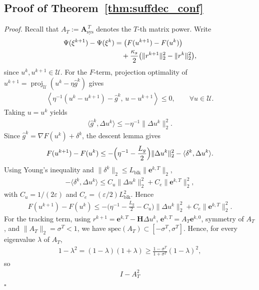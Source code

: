 \documentclass[letterpaper, 10 pt, conference]{ieeeconf} %
\newenvironment{proof}[1][Proof]{\par\noindent\textit{#1. }\ignorespaces}
  {\hfill$\square$\par}
\DeclareMathOperator{\proj}{proj}
\begin{document}
\subsection{Proof of Theorem~\ref{thm:suffdec_conf}}
\begin{proof}
Recall that \(A_T:=\mathbf A_{\mathrm{sys}}^{\,T}\) denotes the \(T\)-th matrix power. Write
\begin{align}
\Psi(\xi^{k+1})-\Psi(\xi^k)
&= \big(F(u^{k+1})-F(u^k)\big) \notag\\
&\quad +\frac{\kappa_s}{2}\big(\|r^{k+1}\|_2^2-\|r^k\|_2^2\big),
\end{align}
since \(u^k,u^{k+1}\in\mathcal U\).
For the \(F\)-term, projection optimality of \(u^{k+1}=\proj_{\mathcal U}(u^k-\eta\hat g^k)\) gives
\begin{align}
\left\langle
\eta^{-1}(u^k-u^{k+1})-\hat g^k,\,
u-u^{k+1}
\right\rangle
\le 0,
\qquad \forall u\in\mathcal U .
\end{align}
Taking \(u=u^k\) yields
\begin{align}
\langle \hat g^k,\Delta u^k\rangle
\le
-\eta^{-1}\|\Delta u^k\|_2^2 .
\end{align}
Since \(\hat g^k=\nabla F(u^k)+\delta^k\), the descent lemma gives
\begin{align}
F(u^{k+1})-F(u^k)
\le
-\Bigl(\eta^{-1}-\frac{L_g}{2}\Bigr)\|\Delta u^k\|_2^2
-\langle \delta^k,\Delta u^k\rangle .
\end{align}
Using Young's inequality and
\(\|\delta^k\|_2\le L_{\mathrm{blk}}\|\mathbf e^{k,T}\|_2\),
\begin{align}
-\langle \delta^k,\Delta u^k\rangle
\le
C_u\|\Delta u^k\|_2^2
+
C_e\|\mathbf e^{k,T}\|_2^2 ,
\end{align}
with \(C_u=1/(2\varepsilon)\) and
\(C_e=(\varepsilon/2)L_{\mathrm{blk}}^2\). Hence
\begin{align}
F(u^{k+1})-F(u^k)
\le
-\Big(\eta^{-1}-\frac{L_g}{2}-C_u\Big)
\|\Delta u^k\|_2^2
+
C_e\|\mathbf e^{k,T}\|_2^2 .
\end{align}
For the tracking term, using \(r^{k+1}=\mathbf e^{k,T}-\mathbf H\Delta u^k\), \(\mathbf e^{k,T}=A_T\mathbf e^{k,0}\), symmetry of \(A_T\), and \(\|A_T\|_2=\sigma^T<1\), we have \(\mathrm{spec}(A_T)\subset[-\sigma^T,\sigma^T]\). Hence, for every eigenvalue \(\lambda\) of \(A_T\),
\begin{align}
1-\lambda^2
=
(1-\lambda)(1+\lambda)
\ge
\frac{1-\sigma^T}{1+\sigma^T}(1-\lambda)^2,
\end{align}
so
\begin{align}
I-A_T^2

\end{align}
\end{proof}
\end{document}
